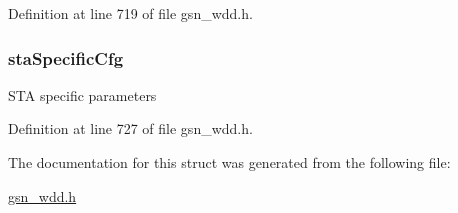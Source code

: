 Definition at line 719 of file gsn\_\-wdd.h.

\hypertarget{a00302_ad38e865ab1c2d66e9b528b45c22261f4}{
\subsubsection[{staSpecificCfg}]{ {\bf staSpecificCfg}}}
\label{a00302_ad38e865ab1c2d66e9b528b45c22261f4}
STA specific parameters 

Definition at line 727 of file gsn\_\-wdd.h.



The documentation for this struct was generated from the following file:\begin{DoxyCompactItemize}
\item 
\hyperlink{a00603}{gsn\_\-wdd.h}\end{DoxyCompactItemize}
